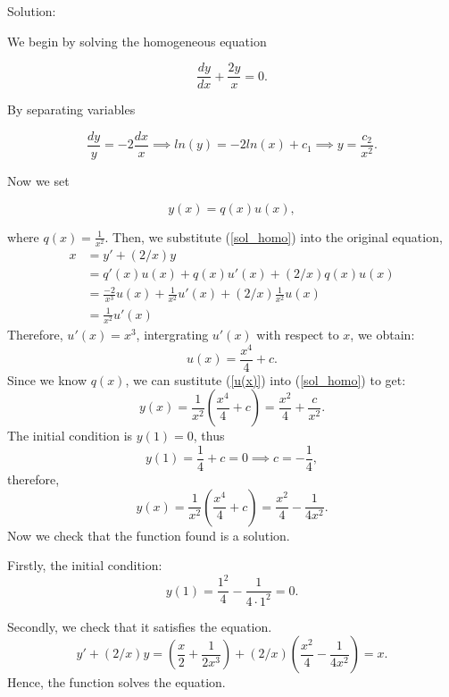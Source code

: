 \documentclass{article}
\renewcommand{\thesubsection}{\thesection.\alph{subsection}} %
\begin{document}
		Solution:

		We begin by solving the homogeneous equation

		\[ \frac{dy}{dx} + \frac{2y}{x} = 0.\]

		By separating variables

		\[\frac{dy}{y} = -2\frac{dx}{x} \implies ln(y) = -2ln(x) + c_1 \implies y = \frac{c_2}{x^2}.\]

		Now we set

		\begin{equation} \label{sol_homo}
			y(x) = q(x)u(x),
		\end{equation}

		where $q(x) = \frac{1}{x^2}$. Then, we substitute (\ref{sol_homo}) into the original equation,
       \begin{equation*}
	         \begin{aligned}
	        	x&=y' + (2/x)y \\
	        	&=q'(x)u(x) +q(x)u'(x) + (2/x)q(x)u(x) \\
	        	&=\frac{-2}{x^3}	u(x) +\frac{1}{x^2}u'(x) + (2/x)\frac{1}{x^2}u(x)\\
	        	&=\frac{1}{x^2}u'(x)
	         \end{aligned}
       \end{equation*}
    Therefore, $u'(x) = x^3$, intergrating $u'(x)$ with respect to $x$, we obtain:
        \begin{equation}\label{u(x)}
        	u(x) = \frac{x^4}{4} + c .
        \end{equation} 
		Since we know $q(x)$, we can sustitute (\ref{u(x)}) into (\ref{sol_homo}) to get:
		\[y(x) = \frac{1}{x^2}\left(\frac{x^4}{4}+c\right) = \frac{x^2}{4} + \frac{c}{x^2}.\]
		The initial condition is $y(1)=0$, thus \[ y(1)=\frac{1}{4} + c= 0 \implies c=-\frac{1}{4},\]
		therefore,
		\[y(x) = \frac{1}{x^2}\left(\frac{x^4}{4}+c\right) = \frac{x^2}{4} - \frac{1}{4x^2}.\]
		Now we check that the function found is a solution.

		Firstly, the initial condition:
		\[y(1)= \frac{1^2}{4} - \frac{1}{4\cdot 1^2} =0.\]

		Secondly, we check that it satisfies the equation.
		\[y'+(2/x)y = \left(\frac{x}{2} + \frac{1}{2x^3}\right) +(2/x)\left(\frac{x^2}{4} - \frac{1}{4x^2}\right) = x.\]
		Hence, the function solves the equation.

\end{document}
